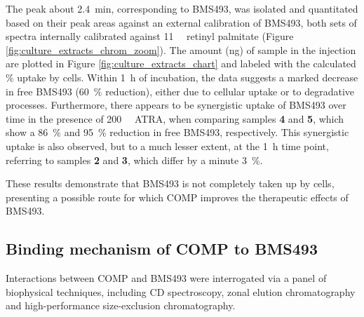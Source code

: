 \begin{refsection}
The peak about \SI{2.4}{\minute}, corresponding to BMS493, was isolated and
quantitated based on their peak areas against an external calibration of BMS493,
both sets of spectra internally calibrated against \SI{11}{\micro\moLar} retinyl
palmitate (Figure \ref{fig:culture_extracts_chrom_zoom}). The amount (\si{\ng})
of sample in the injection are plotted in Figure
\ref{fig:culture_extracts_chart} and labeled with the calculated \% uptake by
cells. Within \SI{1}{\hour} of incubation, the data suggests a marked decrease
in free BMS493 (\SI{60}{\percent} reduction), either due to cellular uptake or to degradative processes.
Furthermore, there appears to be synergistic uptake of BMS493 over time in the
presence of \SI{200}{\nano\moLar} ATRA, when comparing samples \textbf{4} and
\textbf{5}, which show a \SI{86}{\percent} and \SI{95}{\percent} reduction in
free BMS493, respectively. This synergistic uptake is also observed, but to a much lesser
extent, at the \SI{1}{\hour} time point, referring to samples \textbf{2} and
\textbf{3}, which differ by a minute \SI{3}{\percent}.

These results demonstrate that BMS493 is not completely taken up by cells,
presenting a possible route for which COMP improves the therapeutic effects of
BMS493.

\subsection{Binding mechanism of COMP to BMS493}
\label{sec:binding_mechanism}
Interactions between COMP and BMS493 were interrogated via a panel of
biophysical techniques, including CD spectroscopy, zonal elution chromatography
and high-performance size-exclusion chromatography.


\end{refsection}
